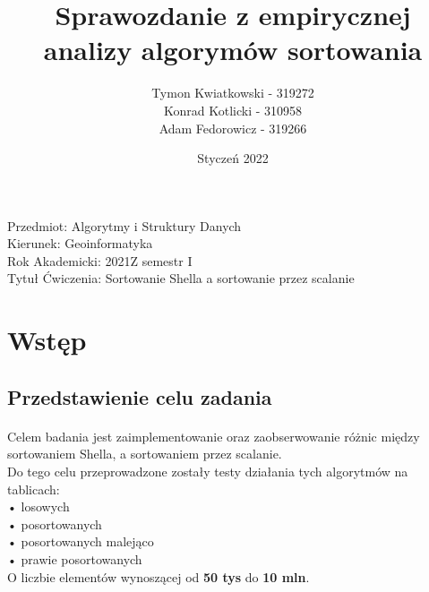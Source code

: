 \documentclass{article}
\author{Tymon Kwiatkowski - 319272\\
    Konrad Kotlicki - 310958\\
    Adam Fedorowicz - 319266\\}
\date{Styczeń 2022}
\title{Sprawozdanie z empirycznej analizy algorymów sortowania}
\begin{document}
\lstset{style=mystyle}

\maketitle

\begin{flushleft}
Przedmiot: Algorytmy i Struktury Danych\\
Kierunek: Geoinformatyka\\
Rok Akademicki: 2021Z semestr I\\
Tytuł Ćwiczenia: Sortowanie Shella a sortowanie przez scalanie
\end{flushleft}

\tableofcontents
\thispagestyle{empty}
\break

\clearpage
{} 
\section{Wstęp}

\subsection{Przedstawienie celu zadania}
\paragraph{} Celem badania jest zaimplementowanie oraz zaobserwowanie różnic między sortowaniem Shella, a sortowaniem przez scalanie.\\
Do tego celu przeprowadzone zostały testy działania tych algorytmów na tablicach:\\
•	losowych\\
•	posortowanych\\
•	posortowanych malejąco\\
•	prawie posortowanych\\
O liczbie  elementów wynoszącej od \textbf{50 tys} do \textbf{10 mln}. \\
\end{document}
